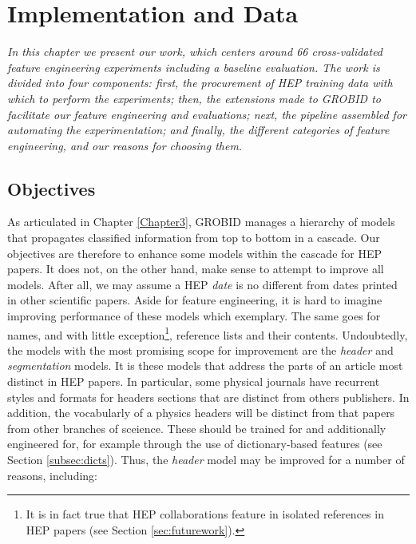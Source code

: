 
\chapter{Implementation and Data} %

\label{Chapter4} %


\emph{In this chapter we present our work, which centers around 66 cross-validated feature engineering experiments including a baseline evaluation. The work is divided into four components: first, the procurement of HEP training data with which to perform the experiments; then, the extensions made to GROBID to facilitate our feature engineering and evaluations; next, the pipeline assembled for automating the experimentation; and finally, the different categories of feature engineering, and our reasons for choosing them.}

\section{Objectives}

As articulated in Chapter \ref{Chapter3}, GROBID manages a hierarchy of models that propagates classified information from top to bottom in a cascade. Our objectives are therefore to enhance some models within the cascade for HEP papers. It does not, on the other hand, make sense to attempt to improve all models. After all, we may assume a HEP \emph{date} is no different from dates printed in other scientific papers. Aside for feature engineering, it is hard to imagine improving performance of these models which exemplary. The same goes for names, and with little exception\footnote{It is in fact true that HEP collaborations feature in isolated references in HEP papers (see Section \ref{sec:futurework}).}, reference lists and their contents. Undoubtedly, the models with the most promising scope for improvement are the \emph{header} and \emph{segmentation} models. It is these models that address the parts of an article most distinct in HEP papers. In particular, some physical journals have recurrent styles and formats for headers sections that are distinct from others publishers. In addition, the vocabularly of a physics headers will be distinct from that papers from other branches of sceience. These should be trained for and additionally engineered for, for example through the use of dictionary-based features (see Section \ref{subsec:dicts}). Thus, the \emph{header} model may be improved for a number of reasons, including:

